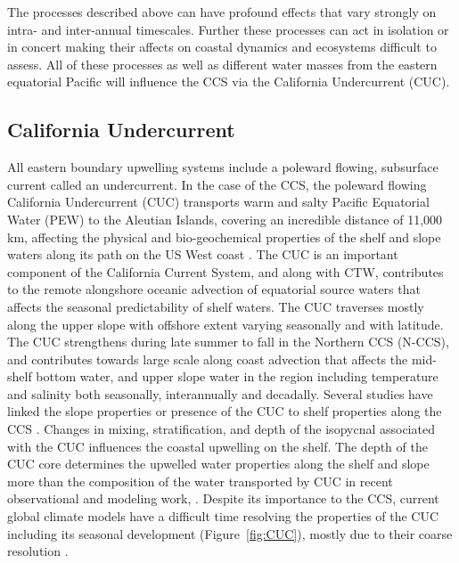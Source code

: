 The processes described above can have profound effects that vary strongly on intra- and inter-annual timescales.  Further these processes can act in isolation or in concert making their affects on coastal dynamics and ecosystems difficult to assess.  All of these processes as well as different water masses from the eastern equatorial Pacific will influence the CCS \citep{bograd2019water,thomson2010poleward,bograd2015changes,meinvielle2013decadal} via the California Undercurrent (CUC). 

\subsection {California Undercurrent} 

All eastern boundary upwelling systems include a poleward flowing, subsurface current called an undercurrent.  In the case of the CCS, the poleward flowing California Undercurrent (CUC) transports warm and salty Pacific Equatorial Water (PEW) to the Aleutian Islands, covering an incredible distance of 11,000 km, affecting the physical and bio-geochemical properties of the shelf and slope waters along its path on the US West coast \citep{reed1976observations,thomson2010poleward,connolly2014coastal,meinvielle2013decadal,nam2015seasonal,hickey2016alongcoast}. The CUC is an important component of the California Current System, and along with CTW, contributes to the remote alongshore oceanic advection of equatorial source waters that affects the seasonal predictability of shelf waters. The CUC traverses mostly along the upper slope with offshore extent varying seasonally and with latitude.  The CUC strengthens during late summer to fall in the Northern CCS (N-CCS), and contributes towards large scale along coast advection that affects the mid-shelf bottom water, and upper slope water in the region \citep{stone2018effect,hickey2016alongcoast} including temperature and salinity both seasonally, interannually and decadally. Several studies have linked the slope properties or presence of the CUC to shelf properties along the CCS \citep{thomson2010poleward,meinvielle2013decadal,turi2018,durski2017influence}.
Changes in mixing, stratification, and depth of the isopycnal associated with the CUC influences the coastal upwelling on the shelf. The depth of the CUC core determines the upwelled water properties along the shelf and slope more than the composition of the water transported by CUC in recent observational and modeling work, \citep{meinvielle2013decadal,stone2018effect}.  Despite its importance to the CCS, current global climate models have a difficult time resolving the properties of the CUC including its seasonal development (Figure~\ref{fig:CUC}), mostly due to their coarse resolution \citep{hickey2016alongcoast}. 

